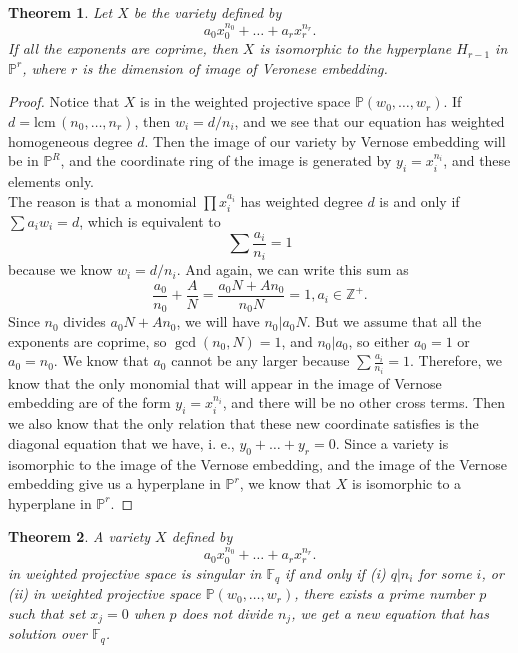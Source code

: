 \documentclass{article}
\newcommand{\Z}{\mathbb{Z}}
\newcommand{\F}{\mathbb{F}}
\newcommand{\Pro}{\mathbb{P}}
\newcommand{\lcm}[0]{\mathrm{lcm} \,}
\newtheorem{theorem}{Theorem}[section]
\theoremstyle{definition}
\theoremstyle{definition}
\theoremstyle{remark}
\begin{document}
\begin{theorem}
Let $X$ be the variety defined by \[a_0 x_0^{n_0} + \dots + a_r x_r^{n_r}.\] If all the exponents are coprime, then $X$ is isomorphic to the hyperplane $H_{r-1}$ in $\Pro^r$, where $r$ is the dimension of image of Veronese embedding.
\end{theorem}

\begin{proof}
Notice that $X$ is in the weighted projective space $\Pro(w_0, \dots, w_r)$. If $d = \lcm(n_0, \dots, n_r)$, then $w_i = d/n_i$, and we see that our equation has weighted homogeneous degree $d$. 
Then the image of our variety by Vernose embedding will be in $\Pro^R$, and the coordinate ring of the image is generated by $y_i = x_i^{n_i}$, and these elements only. \\
The reason is that a monomial $\prod x_i^{a_i}$ has weighted degree $d$ is and only if $\sum a_iw_i = d$, which is equivalent to \[\sum \frac{a_i}{n_i} = 1\] because we know $w_i = d/n_i$. 
And again, we can write this sum as \[\frac{a_0}{n_0} + \frac{A}{N} = \frac{a_0N + An_0}{n_0N} = 1, a_i \in \Z^+.\]
Since $n_0$ divides $a_0N + An_0$, we will have $n_0|a_0N$. But we assume that all the exponents are coprime, so $\gcd(n_0, N) = 1$, and $n_0|a_0$, so either $a_0 = 1$ or $a_0 = n_0$. We know that $a_0$ cannot be any larger because $\sum \frac{a_i}{n_i} = 1$. Therefore, we know that the only monomial that will appear in the image of Vernose embedding are of the form $y_i = x_i^{n_i}$, and there will be no other cross terms. Then we also know that the only relation that these new coordinate satisfies is the diagonal equation that we have, i. e., $y_0 + \dots + y_r = 0$. Since a variety is isomorphic to the image of the Vernose embedding, and the image of the Vernose embedding give us a hyperplane in $\Pro^r$, we know that $X$ is isomorphic to a hyperplane in $\Pro^r$. 
\end{proof}

\begin{theorem}
A variety $X$ defined by \[a_0 x_0^{n_0} + \dots + a_r x_r^{n_r}.\] in weighted projective space is singular in $\F_q$ if and only if (i) $q|n_i$ for some $i$, or (ii) in weighted projective space $\Pro(w_0, \dots, w_r)$, there exists a prime number $p$ such that set $x_j = 0$ when $p$ does not divide $n_j$, we get a new equation that has solution over $\F_q$.
\end{theorem}
\end{document}
